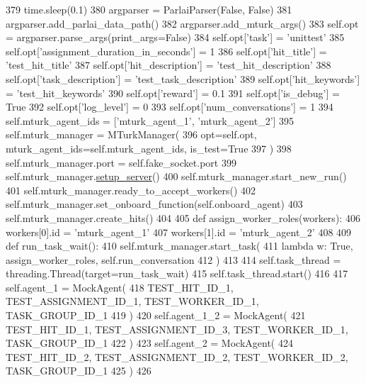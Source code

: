 \begin{DoxyCode}
379         time.sleep(0.1)
380         argparser = ParlaiParser(\textcolor{keyword}{False}, \textcolor{keyword}{False})
381         argparser.add\_parlai\_data\_path()
382         argparser.add\_mturk\_args()
383         self.opt = argparser.parse\_args(print\_args=\textcolor{keyword}{False})
384         self.opt[\textcolor{stringliteral}{'task'}] = \textcolor{stringliteral}{'unittest'}
385         self.opt[\textcolor{stringliteral}{'assignment\_duration\_in\_seconds'}] = 1
386         self.opt[\textcolor{stringliteral}{'hit\_title'}] = \textcolor{stringliteral}{'test\_hit\_title'}
387         self.opt[\textcolor{stringliteral}{'hit\_description'}] = \textcolor{stringliteral}{'test\_hit\_description'}
388         self.opt[\textcolor{stringliteral}{'task\_description'}] = \textcolor{stringliteral}{'test\_task\_description'}
389         self.opt[\textcolor{stringliteral}{'hit\_keywords'}] = \textcolor{stringliteral}{'test\_hit\_keywords'}
390         self.opt[\textcolor{stringliteral}{'reward'}] = 0.1
391         self.opt[\textcolor{stringliteral}{'is\_debug'}] = \textcolor{keyword}{True}
392         self.opt[\textcolor{stringliteral}{'log\_level'}] = 0
393         self.opt[\textcolor{stringliteral}{'num\_conversations'}] = 1
394         self.mturk\_agent\_ids = [\textcolor{stringliteral}{'mturk\_agent\_1'}, \textcolor{stringliteral}{'mturk\_agent\_2'}]
395         self.mturk\_manager = MTurkManager(
396             opt=self.opt, mturk\_agent\_ids=self.mturk\_agent\_ids, is\_test=\textcolor{keyword}{True}
397         )
398         self.mturk\_manager.port = self.fake\_socket.port
399         self.mturk\_manager.\hyperlink{namespaceparlai_1_1chat__service_1_1services_1_1messenger_1_1server__utils_afb56b04206cd0f42384438f1ac6d9cda}{setup\_server}()
400         self.mturk\_manager.start\_new\_run()
401         self.mturk\_manager.ready\_to\_accept\_workers()
402         self.mturk\_manager.set\_onboard\_function(self.onboard\_agent)
403         self.mturk\_manager.create\_hits()
404 
405         \textcolor{keyword}{def }assign\_worker\_roles(workers):
406             workers[0].id = \textcolor{stringliteral}{'mturk\_agent\_1'}
407             workers[1].id = \textcolor{stringliteral}{'mturk\_agent\_2'}
408 
409         \textcolor{keyword}{def }run\_task\_wait():
410             self.mturk\_manager.start\_task(
411                 \textcolor{keyword}{lambda} w: \textcolor{keyword}{True}, assign\_worker\_roles, self.run\_conversation
412             )
413 
414         self.task\_thread = threading.Thread(target=run\_task\_wait)
415         self.task\_thread.start()
416 
417         self.agent\_1 = MockAgent(
418             TEST\_HIT\_ID\_1, TEST\_ASSIGNMENT\_ID\_1, TEST\_WORKER\_ID\_1, TASK\_GROUP\_ID\_1
419         )
420         self.agent\_1\_2 = MockAgent(
421             TEST\_HIT\_ID\_1, TEST\_ASSIGNMENT\_ID\_3, TEST\_WORKER\_ID\_1, TASK\_GROUP\_ID\_1
422         )
423         self.agent\_2 = MockAgent(
424             TEST\_HIT\_ID\_2, TEST\_ASSIGNMENT\_ID\_2, TEST\_WORKER\_ID\_2, TASK\_GROUP\_ID\_1
425         )
426 
\end{DoxyCode}
